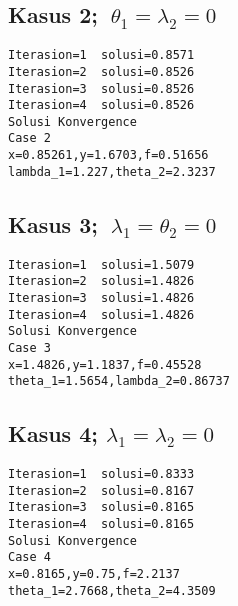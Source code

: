 \documentclass{article}
\begin{document}
\subsection*{Kasus 2; \(\ \theta_1=\lambda_2=0\)}
\begin{lstlisting}
Iterasion=1  solusi=0.8571  
Iterasion=2  solusi=0.8526  
Iterasion=3  solusi=0.8526  
Iterasion=4  solusi=0.8526  
Solusi Konvergence
Case 2
x=0.85261,y=1.6703,f=0.51656
lambda_1=1.227,theta_2=2.3237
\end{lstlisting}
\subsection*{Kasus 3; \(\ \lambda_1=\theta_2=0\)}
\begin{lstlisting}
Iterasion=1  solusi=1.5079  
Iterasion=2  solusi=1.4826  
Iterasion=3  solusi=1.4826  
Iterasion=4  solusi=1.4826  
Solusi Konvergence
Case 3
x=1.4826,y=1.1837,f=0.45528
theta_1=1.5654,lambda_2=0.86737
\end{lstlisting}
\subsection*{Kasus 4; \(\lambda_1=\lambda_2=0\)}
\begin{lstlisting}
Iterasion=1  solusi=0.8333  
Iterasion=2  solusi=0.8167  
Iterasion=3  solusi=0.8165  
Iterasion=4  solusi=0.8165  
Solusi Konvergence
Case 4
x=0.8165,y=0.75,f=2.2137
theta_1=2.7668,theta_2=4.3509
\end{lstlisting}
\end{document}
